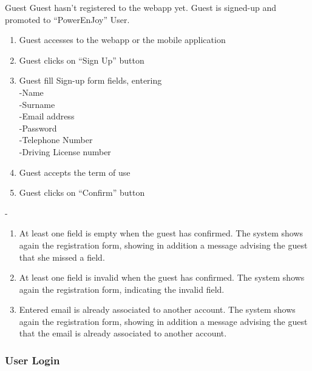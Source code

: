 	
				{Guest}
				{}
				{Guest hasn't registered to the webapp yet.}
				{Guest is signed-up and promoted to ``PowerEnJoy'' User.}
				{
					\begin{enumerate}
						\item Guest accesses to the webapp or the mobile application
						\item Guest clicks on ``Sign Up'' button
						\item Guest fill Sign-up form fields, entering\\
						-Name\\
						-Surname\\
						-Email address\\
						-Password\\
						-Telephone Number\\
						-Driving License number
						\item Guest accepts the term of use
						\item Guest clicks on ``Confirm'' button\end{enumerate}
				}
				{-}
				{
				\begin{enumerate}
					\item At least one field is empty when the guest has confirmed. The system shows again the 									registration form, showing in addition a message advising the guest that she missed a field. 
					\item At least one field is invalid when the guest has confirmed. The system shows again the 									registration form, indicating the invalid field.
					\item Entered email is already associated to another account. The system shows again the 									registration form, showing in addition a message advising the guest that the email is already 								associated to another account.
					
					
					
					\end{enumerate}
				}
\pagebreak


\subsubsection{User Login}\label{login}

